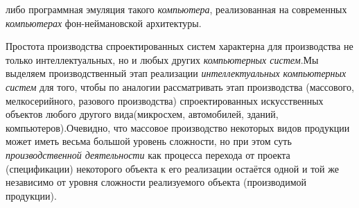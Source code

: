 \begin{scnsubstruct}
{\begin{scnitemize}
            \item либо программная эмуляция такого \textit{компьютера}, реализованная на современных  \textit{компьютерах} фон-неймановской архитектуры.
        \end{scnitemize}
        Простота производства спроектированных систем характерна для производства не только интеллектуальных, но и любых других \textit{компьютерных систем}.Мы выделяем производственный этап реализации \textit{интеллектуальных компьютерных систем} для того, чтобы по аналогии рассматривать этап производства (массового, мелкосерийного, разового производства) спроектированных искусственных объектов любого другого вида(микросхем, автомобилей, зданий,  компьютеров).Очевидно, что массовое производство некоторых видов продукции может иметь весьма большой уровень сложности, но при этом суть \textit{производственной деятельности} как процесса перехода от проекта (спецификации) некоторого объекта к его реализации остаётся одной и той же независимо от уровня сложности  реализуемого объекта (производимой продукции).}
    \begin{scnhaselementset}
    \end{scnhaselementset}
    \bigskip\begin{scnhaselementset}
    \end{scnhaselementset}
    \begin{scneqtoset}
\end{scneqtoset}
\end{scnsubstruct}
